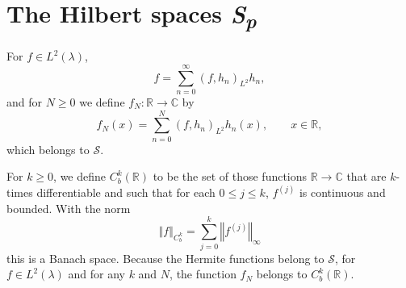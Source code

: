 \documentclass{article}
\newcommand{\norm}[1]{\left\Vert #1 \right\Vert}
\theoremstyle{definition}
\begin{document}
\section{The Hilbert spaces {\em S\textsubscript{p}}}
For $f \in L^2(\lambda)$,
\[
f = \sum_{n=0}^\infty (f,h_n)_{L^2}h_n,
\]
and for $N \geq 0$  we define $f_N:\mathbb{R} \to \mathbb{C}$ by
\[
f_N(x) = \sum_{n=0}^N (f,h_n)_{L^2}h_n(x),\qquad x \in \mathbb{R},
\]
which belongs to $\mathscr{S}$. 

For $k \geq 0$, we define $C_b^k(\mathbb{R})$ to be the set of those functions
$\mathbb{R} \to \mathbb{C}$ that are $k$-times differentiable and
 such that for each $0 \leq j \leq k$, $f^{(j)}$  is continuous and bounded. With the norm
\[
\norm{f}_{C_b^k} = \sum_{j=0}^k \norm{f^{(j)}}_\infty
\]
this is a Banach space. 
Because the Hermite functions belong to $\mathscr{S}$, for $f \in L^2(\lambda)$ and for any $k$ 
and $N$, the function $f_N$ belongs to $C_b^k(\mathbb{R})$.  
\end{document}

